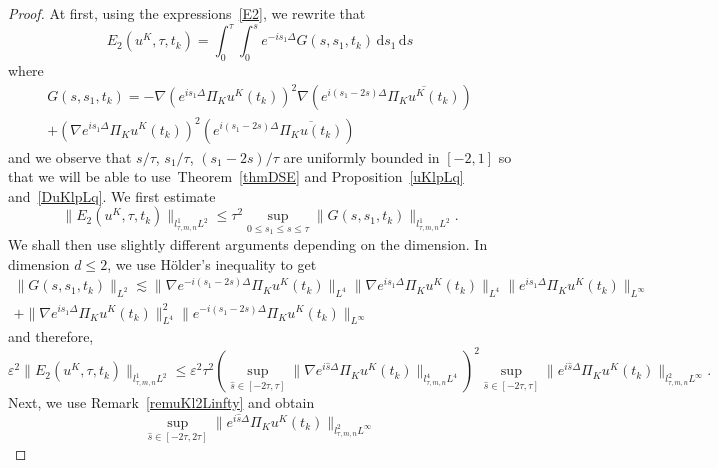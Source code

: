 \documentclass[10pt,a4paper]{article}
\begin{document}
  \begin{proof}
    At first, using the expressions~\eqref{E2}, we rewrite that
    \begin{equation}%
      E_2(u^K,\tau,t_k) = \int_0^\tau \int_0^s e^{-is_1\Delta} G(s,s_1,t_k)\,\mathrm{d}s_1\,\mathrm{d}s
    \end{equation}
    where
    \begin{multline*}
      G(s,s_1,t_k) =  -\nabla\left( e^{is_1\Delta} \Pi_K u^K(t_k) \right)^2 
      \nabla \left( e^{i(s_1-2s)\Delta} \overline{\Pi_K u^K(t_k)} \right) \\
      + \left( \nabla e^{is_1\Delta} \Pi_K u^K(t_k) \right)^2 \left( e^{i(s_1-2s)\Delta} \overline{\Pi_K u(t_k)} \right)
    \end{multline*}
    and we observe that \(s/\tau\), \(s_1/\tau\), \((s_1- 2s)/\tau\) are uniformly
    bounded in \([-2, 1]\) so that we will be able to use~Theorem~\ref{thmDSE}
    and Proposition~\ref{uKlpLq} and~\ref{DuKlpLq}.
    We first estimate
    \begin{equation}%
      \|E_2(u^K,\tau,t_k)\|_{l^1_{\tau,m,n}L^2} \leq \tau^2  
      \sup_{0 \leq s_1 \leq s \leq \tau} \|G(s, s_1, t_k)\|_{l^1_{\tau,m,n}L^2}.
    \end{equation}
    We shall then use slightly different arguments depending on the dimension.
    In dimension \(d \leq 2\), we use H\"older's inequality to get
    \begin{multline*}
      \|G(s,s_1,t_k)\|_{L^2} \lesssim  \|\nabla e^{-i(s_1-2s)\Delta}\Pi_{K}u^K(t_k)\|_{L^4} 
      \|\nabla e^{is_1\Delta} \Pi_{K}u^K(t_k)\|_{L^4}
      \|e^{is_1\Delta}\Pi_{K}u^K(t_k)\|_{L^\infty}  \\
      + \|\nabla e^{is_1\Delta}\Pi_{K}u^K(t_k)\|_{L^4}^2 \|e^{-i(s_1-2s)\Delta}\Pi_{K}u^K(t_k)\|_{L^\infty}
    \end{multline*}
    and therefore,
    \begin{equation}\label{F2lpLq}
      \varepsilon^2 \|E_2(u^K,\tau,t_k)\|_{l^1_{\tau,m,n}L^2} \leq  
      \varepsilon^2 \tau^2
      \left(\sup_{\hat{s} \in [-2\tau,\tau]}  
      \|\nabla e^{i\hat{s}\Delta}\Pi_K u^K(t_k)\|_{l^4_{\tau,m,n}L^4}  \right)^2 
      \sup_{\hat s \in [-2\tau, \tau]} \|e^{i\hat{s}\Delta}\Pi_K u^K(t_k)\|_{l^2_{\tau,m,n}L^\infty}.
    \end{equation}
    Next, we use Remark~\ref{remuKl2Linfty} and obtain 
    \begin{equation}\label{expuKl2Linfty}
      \sup_{\hat s \in [-2\tau, 2\tau]} \|e^{i\hat s\Delta}\Pi_{K} u^K(t_{k})\|_{l^2_{\tau,m,n}L^\infty} 

\end{equation}
\end{proof}
\end{document}
